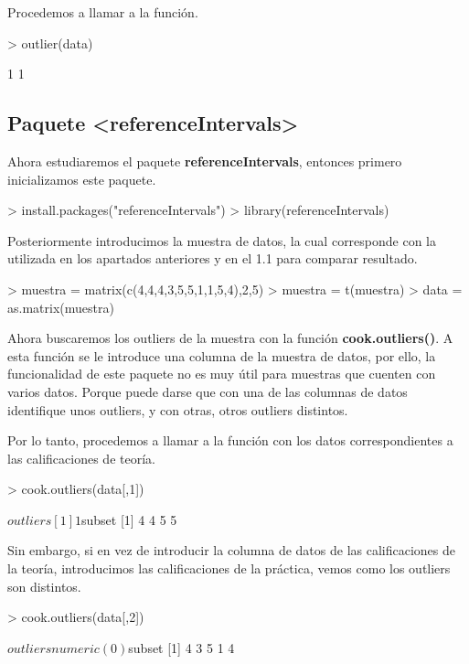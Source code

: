 \documentclass [a4paper] {article}
\begin{document}
\bigskip
Procedemos a llamar a la función.
\begin{Schunk}
\begin{Sinput}
> outlier(data)
\end{Sinput}
\begin{Soutput}
[1] 1 1
\end{Soutput}
\end{Schunk}

\subsection{Paquete <referenceIntervals>}
\bigskip
Ahora estudiaremos el paquete \textbf{referenceIntervals}, entonces primero inicializamos este paquete.
\begin{Schunk}
\begin{Sinput}
> install.packages("referenceIntervals")
> library(referenceIntervals)
\end{Sinput}
\end{Schunk}

\bigskip
Posteriormente introducimos la muestra de datos, la cual corresponde con la utilizada en los apartados
anteriores y en el 1.1 para comparar resultado.
\begin{Schunk}
\begin{Sinput}
> muestra = matrix(c(4,4,4,3,5,5,1,1,5,4),2,5)
> muestra = t(muestra)
> data = as.matrix(muestra)
\end{Sinput}
\end{Schunk}

\bigskip
Ahora buscaremos los outliers de la muestra con la función \textbf{cook.outliers()}. A esta función se
le introduce una columna de la muestra de datos, por ello, la funcionalidad de este paquete no es muy
útil para muestras que cuenten con varios datos. Porque puede darse que con una de las columnas de datos
identifique unos outliers, y con otras, otros outliers distintos.

\bigskip
Por lo tanto, procedemos a llamar a la función con los datos correspondientes a las calificaciones de teoría.
\begin{Schunk}
\begin{Sinput}
> cook.outliers(data[,1])
\end{Sinput}
\begin{Soutput}
$outliers
[1] 1

$subset
[1] 4 4 5 5
\end{Soutput}
\end{Schunk}

\bigskip
Sin embargo, si en vez de introducir la columna de datos de las calificaciones de la teoría, introducimos
las calificaciones de la práctica, vemos como los outliers son distintos.
\begin{Schunk}
\begin{Sinput}
> cook.outliers(data[,2])
\end{Sinput}
\begin{Soutput}
$outliers
numeric(0)

$subset
[1] 4 3 5 1 4
\end{Soutput}
\end{Schunk}
\end{document}

